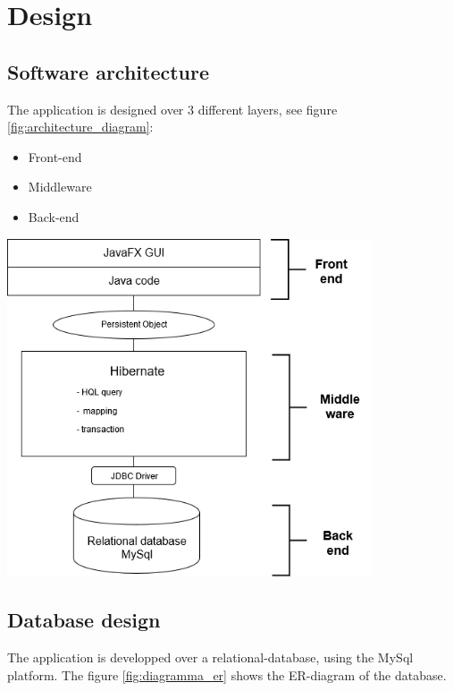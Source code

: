 \documentclass[a4paper, oneside]{article}
\begin{document}
\clearpage
\section{Design}

\subsection{Software architecture}
The application is designed over 3 different layers, see figure \ref{fig:architecture_diagram}:
\begin{itemize}
\item Front-end
\item Middleware
\item Back-end
\end{itemize}
\vspace{5mm}
\begin{minipage}{\linewidth}
\begin{center}
\vspace{1mm}
\includegraphics[height = 100mm]{./images/diagrams/architecture_diagram.png} 
\vspace{6mm}
\label{fig:architecture_diagram}
\end{center}
\end{minipage}
\vspace{5mm}

\clearpage
\subsection{Database design}
The application is developped over a relational-database, using the MySql platform. The figure \ref{fig:diagramma_er} shows the ER-diagram of the database.\\
\end{document}
